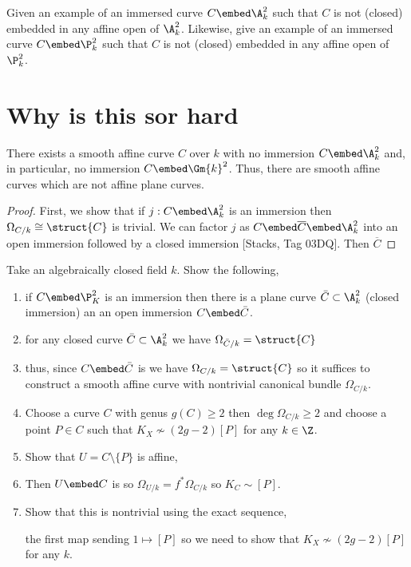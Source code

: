 \documentclass[12pt]{article}
\begin{document}
\begin{exercise}
Given an example of an immersed curve $C \embed \A^2_k$ such that $C$ is not (closed) embedded in any affine open of $\A^2_k$. Likewise, give an example of an immersed curve $C \embed \P^2_k$ such that $C$ is not (closed) embedded in any affine open of $\P^2_k$.
\end{exercise}

\section{Why is this sor hard}


\begin{prop}
There exists a smooth affine curve $C$ over $k$ with no immersion $C \embed \A^2_k$ and, in particular, no immersion $C \embed \Gm{k}^2$. Thus, there are smooth affine curves which are not affine plane curves. 
\end{prop}

\begin{proof}
First, we show that if $j : C \embed \A^2_k$ is an immersion then $\Omega_{C/k} \cong \struct{C}$ is trivial. We can factor $j$ as $C \embed \overline{C} \embed \A^2_k$ into an open immersion followed by a closed immersion [Stacks, Tag 03DQ]. Then $\overline{C}$ 
\end{proof}

Take an algebraically closed field $k$. Show the following,
\begin{enumerate}
\item if $C \embed \P^2_K$ is an immersion then there is a plane curve $\bar{C} \subset \A^2_k$ (closed immersion) an an open immersion $C \embed \bar{C}$.
\item for any closed curve $\bar{C} \subset \A^2_k$ we have $\Omega_{\bar{C}/k} = \struct{C}$
\item thus, since $C \embed \bar{C}$ is \etale we have $\Omega_{C/k} = \struct{C}$ so it suffices to construct a smooth affine curve with nontrivial canonical bundle $\Omega_{C/k}$.
\item Choose a curve $C$ with genus $g(C) \ge 2$ then $\deg{\Omega_{C/k}} \ge 2$ and choose a point $P \in C$ such that $K_X \not\sim (2g - 2) [P]$ for any $k \in \Z$.
\item Show that $U = C \setminus \{ P \}$ is affine,
\item Then $U \embed C$ is \etale so $\Omega_{U / k} = f^* \Omega_{C/k}$ so $K_C \sim [P]$. 
\item Show that this is nontrivial using the exact sequence,
\begin{center}
\end{center}
the first map sending $1 \mapsto [P]$ so we need to show that $K_X \not\sim (2g - 2) [P]$ for any $k$. 
\end{enumerate}
\end{document}
